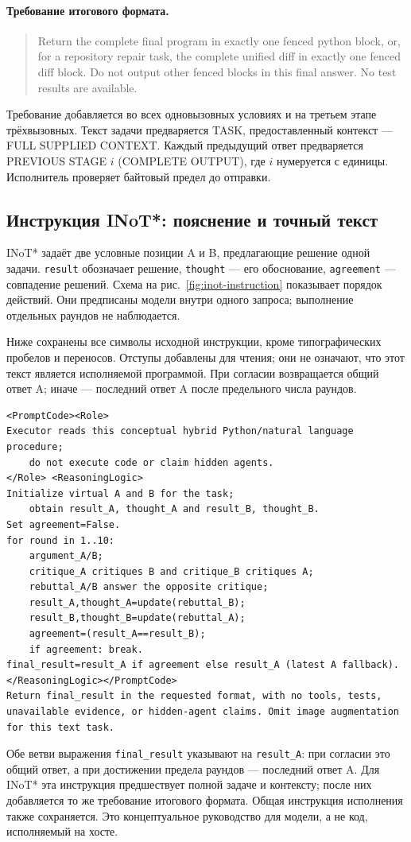 \paragraph*{Требование итогового формата.}
\begin{quote}\small
Return the complete final program in exactly one fenced python block, or, for a repository repair task, the complete unified diff in exactly one fenced diff block. Do not output other fenced blocks in this final answer. No test results are available.
\end{quote}
Требование добавляется во всех одновызовных условиях и на третьем этапе трёхвызовных. Текст задачи предваряется TASK, предоставленный контекст --- FULL SUPPLIED CONTEXT. Каждый предыдущий ответ предваряется PREVIOUS STAGE $i$ (COMPLETE OUTPUT), где $i$ нумеруется с единицы. Исполнитель проверяет байтовый предел до отправки.
\clearpage\subsection{Инструкция INoT*: пояснение и точный текст}
\label{app:inot-instruction}
INoT* задаёт две условные позиции A и B, предлагающие решение одной задачи. \texttt{result} обозначает решение, \texttt{thought} --- его обоснование, \texttt{agreement} --- совпадение решений. Схема на рис.~\ref{fig:inot-instruction} показывает порядок действий. Они предписаны модели внутри одного запроса; выполнение отдельных раундов не наблюдается.

Ниже сохранены все символы исходной инструкции, кроме типографических пробелов и переносов. Отступы добавлены для чтения; они не означают, что этот текст является исполняемой программой. При согласии возвращается общий ответ A; иначе --- последний ответ A после предельного числа раундов.

\begin{lstlisting}[basicstyle=\ttfamily\small,breaklines=true,columns=fullflexible,keepspaces=true,showstringspaces=false,frame=single,framerule=0.3pt]
<PromptCode><Role>
Executor reads this conceptual hybrid Python/natural language procedure;
    do not execute code or claim hidden agents.
</Role> <ReasoningLogic>
Initialize virtual A and B for the task;
    obtain result_A, thought_A and result_B, thought_B.
Set agreement=False.
for round in 1..10:
    argument_A/B;
    critique_A critiques B and critique_B critiques A;
    rebuttal_A/B answer the opposite critique;
    result_A,thought_A=update(rebuttal_B);
    result_B,thought_B=update(rebuttal_A);
    agreement=(result_A==result_B);
    if agreement: break.
final_result=result_A if agreement else result_A (latest A fallback).
</ReasoningLogic></PromptCode>
Return final_result in the requested format, with no tools, tests, unavailable evidence, or hidden-agent claims. Omit image augmentation for this text task.
\end{lstlisting}
Обе ветви выражения \texttt{final\_result} указывают на \texttt{result\_A}: при согласии это общий ответ, а при достижении предела раундов --- последний ответ A.
Для INoT* эта инструкция предшествует полной задаче и контексту; после них добавляется то же требование итогового формата. Общая инструкция исполнения также сохраняется. Это концептуальное руководство для модели, а не код, исполняемый на хосте.
\endgroup

